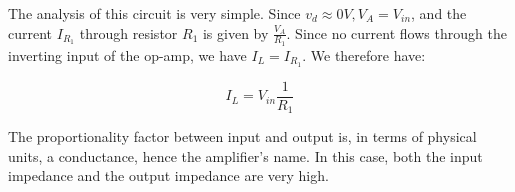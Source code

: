 \documentclass[../main.tex]{subfiles}
\begin{document}
The analysis of this circuit is very simple. Since $v_d \approx 0 V, V_A = V_{in}$, and the current $I_{R_1}$ through resistor $R_1$ is given by $\frac{V_A}{R_1}$. Since no current flows through the inverting input of the op-amp, we have $I_L = I_{R_1}$. We therefore have:

\begin{equation}
	I_L = V_{in} \frac{1}{R_1}
\end{equation}

The proportionality factor between input and output is, in terms of physical units, a conductance, hence the amplifier’s name. In this case, both the input impedance and the output impedance are very high.


%
%
%
\end{document}
